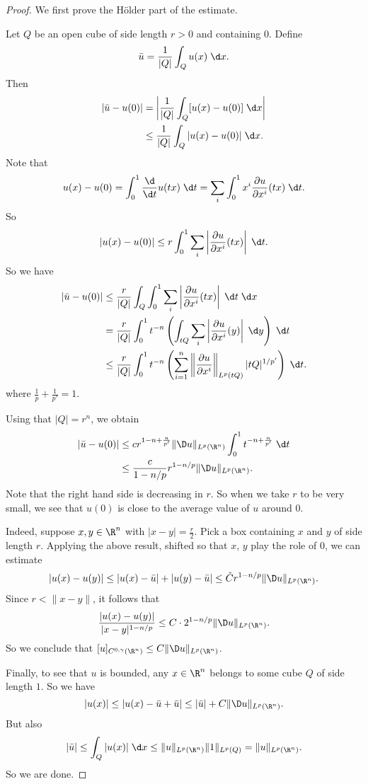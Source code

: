 \documentclass[a4paper]{article}
\begin{document}
\begin{proof}
  We first prove the H\"older part of the estimate.

  Let $Q$ be an open cube of side length $r > 0$ and containing $0$. Define
  \[
    \bar{u} = \frac{1}{|Q|} \int_Q u(x)\;\d x.
  \]
  Then
  \begin{align*}
    |\bar{u} - u(0)| &= \left|\frac{1}{|Q|} \int_Q [u(x) - u(0)]\;\d x\right|\\
    &\leq \frac{1}{|Q|} \int_Q |u(x) - u(0)|\;\d x.
  \end{align*}
  Note that
  \[
    u(x) - u(0) = \int_0^1 \frac{\d}{\d t} u(tx)\;\d t = \sum_i \int_0^1 x^i \frac{\partial u}{\partial x^i} (tx)\;\d t.
  \]
  So
  \[
    |u(x) - u(0)| \leq r \int_0^1 \sum_i \left|\frac{\partial u}{\partial x^i} (tx)\right|\;\d t.
  \]
  So we have
  \begin{align*}
    |\bar{u} - u(0)| &\leq \frac{r}{|Q|} \int_Q \int_0^1 \sum_i \left|\frac{\partial u}{\partial x^i}(tx)\right|\;\d t\;\d x\\
    &= \frac{r}{|Q|} \int_0^1 t^{-n} \left(\int_{tQ} \sum_i \left|\frac{\partial u}{\partial x^i} (y)\right|\;\d y \right)\;\d t\\
    &\leq \frac{r}{|Q|} \int_0^1 t^{-n} \left(\sum_{i = 1}^n \left\|\frac{\partial u}{\partial x^i}\right\|_{L^p(tQ)} |tQ|^{1/p'}\right)\;\d t.
  \end{align*}
  where $\frac{1}{p} + \frac{1}{p'} = 1$.

  Using that $|Q| = r^n$, we obtain
  \begin{align*}
    |\bar{u} - u(0)| &\leq c r^{1 -n + \frac{n}{p'}} \|\D u\|_{L^p(\R^n)} \int_0^1 t^{-n + \frac{n}{p'}} \;\d t\\
    &\leq \frac{c}{1 - n/p} r^{1 - n/p} \|\D u\|_{L^p(\R^n)}.
  \end{align*}
  Note that the right hand side is decreasing in $r$. So when we take $r$ to be very small, we see that $u(0)$ is close to the average value of $u$ around $0$.

  Indeed, suppose $x, y \in \R^n$ with $|x - y| = \frac{r}{2}$. Pick a box containing $x$ and $y$ of side length $r$. Applying the above result, shifted so that $x$, $y$ play the role of $0$, we can estimate
  \[
    |u(x) - u(y)| \leq |u(x) - \bar{u}| + |u(y) - \bar{u}| \leq \tilde{C} r^{1 - n/p} \|\D u\|_{L^p(\R^n)}.
  \]
  Since $r < \|x - y\|$, it follows that
  \[
    \frac{|u(x) - u(y)|}{|x - y|^{1 - n/p}} \leq C \cdot 2^{1 - n/p} \|\D u\|_{L^p(\R^n)}.
  \]
  So we conclude that $[u]_{C^{0, \gamma}(\R^n)} \leq C \|\D u\|_{L^p(\R^n)}$.

  Finally, to see that $u$ is bounded, any $x \in \R^n$ belongs to some cube $Q$ of side length $1$. So we have
  \[
    |u(x)| \leq |u(x) - \bar{u} + \bar{u}| \leq |\bar{u}| + C \|\D u\|_{L^p(\R^n)}.
  \]
  But also
  \[
    |\bar{u}| \leq \int_Q |u(x)|\;\d x \leq \|u\|_{L^p(\R^n)} \|1\|_{L^p(Q)} = \|u\|_{L^p(\R^n)}.
  \]
  So we are done.
\end{proof}
\end{document}

